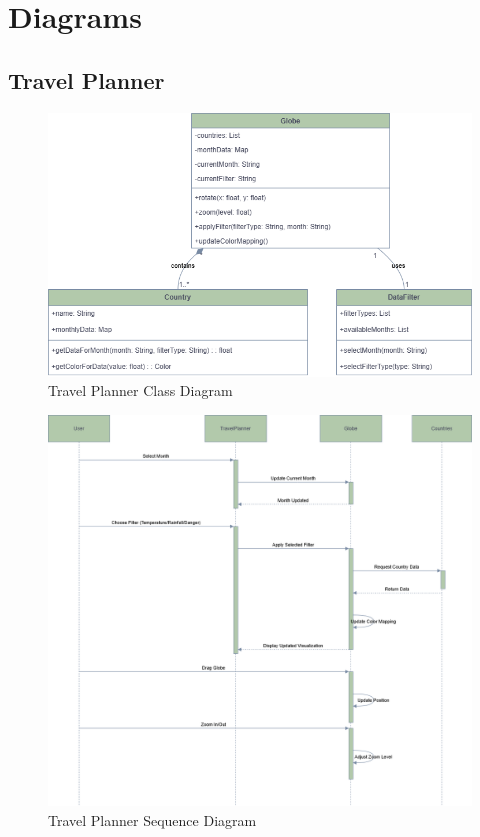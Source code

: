 \documentclass[]{project_interim}
\begin{document}
\section{Diagrams}
\subsection{Travel Planner}

\begin{figure}[ht!]
  \centering
  \includegraphics[width=\textwidth]{Travel Planner Class Diagram.png}
  \vspace*{0.0cm}
  \caption{Travel Planner Class Diagram}
  \label{fig:1}
\end{figure}
\newpage
\begin{figure}[ht!]
  \centering
  \includegraphics[width=\textwidth]{Travel Planner Sequence Diagram.png}
  \vspace*{0.0cm}
  \caption{Travel Planner Sequence Diagram}
  \label{fig:1}
\end{figure}
\end{document}
